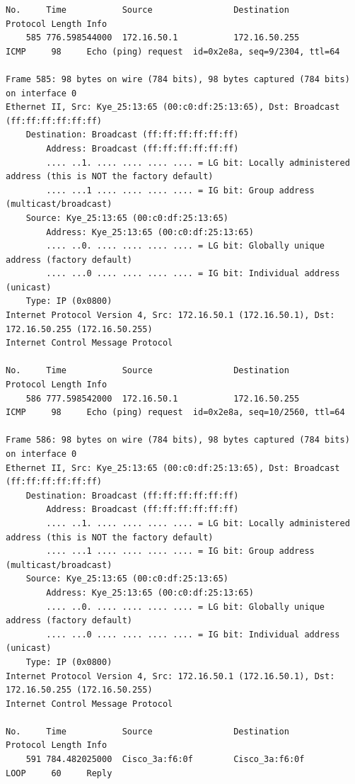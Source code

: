 \documentclass[a4paper,11pt]{article}
\begin{document}
\begin{lstlisting}
No.     Time           Source                Destination           Protocol Length Info
    585 776.598544000  172.16.50.1           172.16.50.255         ICMP     98     Echo (ping) request  id=0x2e8a, seq=9/2304, ttl=64

Frame 585: 98 bytes on wire (784 bits), 98 bytes captured (784 bits) on interface 0
Ethernet II, Src: Kye_25:13:65 (00:c0:df:25:13:65), Dst: Broadcast (ff:ff:ff:ff:ff:ff)
    Destination: Broadcast (ff:ff:ff:ff:ff:ff)
        Address: Broadcast (ff:ff:ff:ff:ff:ff)
        .... ..1. .... .... .... .... = LG bit: Locally administered address (this is NOT the factory default)
        .... ...1 .... .... .... .... = IG bit: Group address (multicast/broadcast)
    Source: Kye_25:13:65 (00:c0:df:25:13:65)
        Address: Kye_25:13:65 (00:c0:df:25:13:65)
        .... ..0. .... .... .... .... = LG bit: Globally unique address (factory default)
        .... ...0 .... .... .... .... = IG bit: Individual address (unicast)
    Type: IP (0x0800)
Internet Protocol Version 4, Src: 172.16.50.1 (172.16.50.1), Dst: 172.16.50.255 (172.16.50.255)
Internet Control Message Protocol

No.     Time           Source                Destination           Protocol Length Info
    586 777.598542000  172.16.50.1           172.16.50.255         ICMP     98     Echo (ping) request  id=0x2e8a, seq=10/2560, ttl=64

Frame 586: 98 bytes on wire (784 bits), 98 bytes captured (784 bits) on interface 0
Ethernet II, Src: Kye_25:13:65 (00:c0:df:25:13:65), Dst: Broadcast (ff:ff:ff:ff:ff:ff)
    Destination: Broadcast (ff:ff:ff:ff:ff:ff)
        Address: Broadcast (ff:ff:ff:ff:ff:ff)
        .... ..1. .... .... .... .... = LG bit: Locally administered address (this is NOT the factory default)
        .... ...1 .... .... .... .... = IG bit: Group address (multicast/broadcast)
    Source: Kye_25:13:65 (00:c0:df:25:13:65)
        Address: Kye_25:13:65 (00:c0:df:25:13:65)
        .... ..0. .... .... .... .... = LG bit: Globally unique address (factory default)
        .... ...0 .... .... .... .... = IG bit: Individual address (unicast)
    Type: IP (0x0800)
Internet Protocol Version 4, Src: 172.16.50.1 (172.16.50.1), Dst: 172.16.50.255 (172.16.50.255)
Internet Control Message Protocol

No.     Time           Source                Destination           Protocol Length Info
    591 784.482025000  Cisco_3a:f6:0f        Cisco_3a:f6:0f        LOOP     60     Reply


\end{lstlisting}
\end{document}
